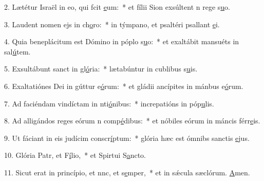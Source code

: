 2. Lætétur Israël in eo, qui fcit \uline{e}um:~* et fílii Sion exsúltent n rege s\uline{u}o.\par 
3. Laudent nomen ejs in ch\uline{o}ro:~* in týmpano, et psaltéri psallant \uline{e}i.\par 
4. Quia beneplácitum est Dómino in póplo s\uline{u}o:~* et exaltábit mansuéts in sal\uline{ú}tem.\par 
5. Exsultábunt sanct in gl\uline{ó}ria:~* lætabúntur in cublibus s\uline{u}is.\par 
6. Exaltatiónes Dei in gúttur e\uline{ó}rum:~* et gládii ancípites in mánbus e\uline{ó}rum.\par 
7. Ad faciéndam vindíctam in nti\uline{ó}nibus:~* increpatións in póp\uline{u}lis.\par 
8. Ad alligándos reges eórum n comp\uline{é}dibus:~* et nóbiles eórum in máncis férr\uline{e}is.\par 
9. Ut fáciant in eis judícim conscr\uline{í}ptum:~* glória hæc est ómnibs sanctis \uline{e}jus.\par 
10. Glória Patr, et F\uline{í}lio,~* et Spirtui S\uline{a}ncto.\par 
11. Sicut erat in princípio, et nnc, et s\uline{e}mper,~* et in sǽcula sæclórum. \uline{A}men.\par 
